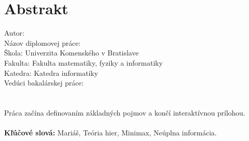\chapter*{Abstrakt}
Autor: \mfauthor\\
Názov diplomovej práce: \mftitle\\
Škola: Univerzita Komenského v Bratislave\\
Fakulta: Fakulta matematiky, fyziky a informatiky\\
Katedra: Katedra informatiky\\
Vedúci bakalárskej práce: \mfadvisor\\
\mfplacedate\\\\
Práca začína definovaním základných pojmov a končí interaktívnou prílohou.\\\\
{\bf Kľúčové slová: }Mariáš, Teória hier, Minimax, Neúplna informácia.